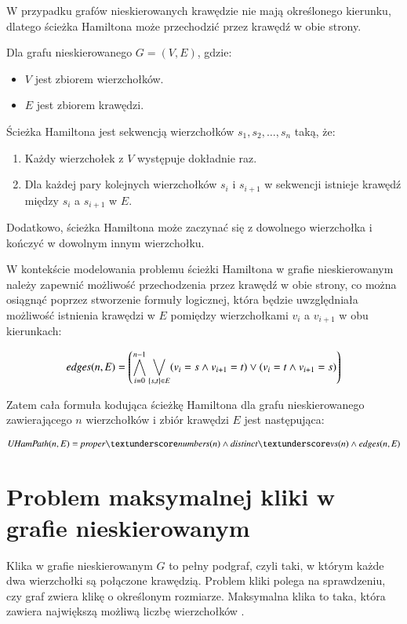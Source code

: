 W przypadku grafów nieskierowanych krawędzie nie mają określonego kierunku, dlatego ścieżka Hamiltona może przechodzić przez krawędź w obie strony. 

Dla grafu nieskierowanego $G = (V, E)$, gdzie:
\begin{itemize}
	\item \(V\) jest zbiorem wierzchołków.
	\item \(E\) jest zbiorem krawędzi.
\end{itemize}
Ścieżka Hamiltona jest sekwencją wierzchołków $s_1, s_2, …, s_n$ taką, że:
\begin{enumerate}
	\item Każdy wierzchołek z \(V\) występuje dokładnie raz.
	\item Dla każdej pary kolejnych wierzchołków \(s_i\) i \(s_{i+1}\) w sekwencji istnieje krawędź między \(s_i\) a \(s_{i+1}\) w \(E\). 
\end{enumerate}

Dodatkowo, ścieżka Hamiltona może zaczynać się z dowolnego wierzchołka i kończyć w dowolnym innym wierzchołku.

W kontekście modelowania problemu ścieżki Hamiltona w grafie nieskierowanym należy zapewnić możliwość przechodzenia przez krawędź w obie strony, co można osiągnąć poprzez stworzenie formuły logicznej, która będzie uwzględniała możliwość istnienia krawędzi w \(E\) pomiędzy wierzchołkami \(v_i\) a \(v_{i+1}\) w obu kierunkach:

\begin{align*}
	{\mathit{edges(n, E)}} = \left( \bigwedge_{i=0}^{n-1} \bigvee_{\{s,t\} \in E} (v_i = s \land v_{i+1} = t) \lor (v_i = t \land v_{i+1} = s) \right)
\end{align*}


Zatem cała formuła kodująca ścieżkę Hamiltona dla grafu nieskierowanego zawierającego \(n\) wierzchołków i zbiór krawędzi \(E\) jest następująca:

\begin{align*}
	\UHamPath(n, E) = \propernumbers \land \distinctvs \land \edges
\end{align*}


\section{Problem maksymalnej kliki w grafie nieskierowanym}

Klika w grafie nieskierowanym \(G\) to pełny podgraf, czyli taki, w którym każde dwa wierzchołki są połączone krawędzią. Problem kliki polega na sprawdzeniu, czy graf zwiera klikę o określonym rozmiarze. Maksymalna klika to taka, która zawiera największą możliwą liczbę wierzchołków \cite{Sipser0086373}. 

